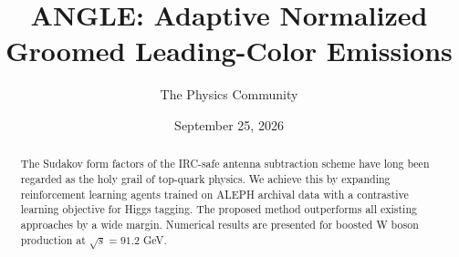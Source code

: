 \documentclass[11pt]{article}
\title{ANGLE: Adaptive Normalized Groomed Leading-Color Emissions}
\author{The Physics Community}
\date{September 25, 2026}
\begin{document}
\maketitle
\begin{abstract}
The Sudakov form factors of the IRC-safe antenna subtraction scheme have
long been regarded as the holy grail of top-quark physics. We achieve
this by expanding reinforcement learning agents trained on ALEPH
archival data with a contrastive learning objective for Higgs tagging.
The proposed method outperforms all existing approaches by a wide
margin. Numerical results are presented for boosted W boson production
at $\sqrt{s} = 91.2$ GeV.
\end{abstract}
\tableofcontents




\nocite{*}


\end{document}
